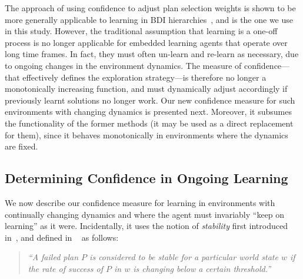 The approach of using confidence to adjust plan selection weights is shown to be more generally applicable to learning in BDI hierarchies~\cite{singh10:extending,singh10:learning}, and is the one we use in this study. However, the traditional assumption that learning is a one-off process is no longer applicable for embedded learning agents that operate over long time frames. In fact, they must often un-learn and re-learn as necessary, due to ongoing changes in the environment dynamics. The measure of confidence---that effectively defines the exploration strategy---is therefore no longer a monotonically increasing function, and must dynamically adjust accordingly if previously learnt solutions no longer work. Our new confidence measure for such environments with changing dynamics is presented next. Moreover, it subsumes the functionality of the former methods (it may be used as a direct replacement for them), since it behaves monotonically in environments where the dynamics are fixed. 

\subsection{Determining Confidence in Ongoing Learning}\label{sec:confidence}

We now describe our confidence measure for learning in environments with continually changing dynamics and where the agent must invariably ``keep on learning'' as it were. Incidentally, it uses the notion of {\em stability} first introduced in~\cite{airiau09:enhancing}, and defined in ~\cite{singh10:learning} as follows:

\begin{quote}
\emph{``A failed plan $P$ is considered to be stable for a particular world state $w$ if the rate of success of $P$ in $w$ is changing below a certain threshold.''}
\end{quote} 

\newcommand{\ds}{\zeta}
\newcommand{\app}{\mathname{app}}
\newcommand{\stable}{\mathname{stable}}

